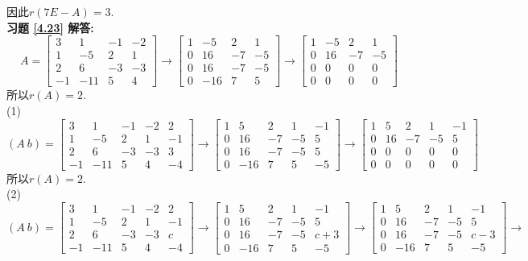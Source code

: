 因此$r(7E-A)=3.$\\
\textbf{习题 \ref{4.23} 解答:}\\
$$A=\begin{bmatrix}3&1&-1&-2\\1&-5&2&1\\2&6&-3&-3\\-1&-11&5&4\end{bmatrix}\rightarrow\begin{bmatrix}1&-5&2&1\\ 0&16&-7&-5\\0&16&-7&-5\\0&-16&7&5\end{bmatrix}
\rightarrow\begin{bmatrix}1&-5&2&1\\ 0&16&-7&-5\\0&0&0&0\\0&0&0&0\end{bmatrix}$$
所以$r(A)=2$.\\
(1) $$(A\ b)=\begin{bmatrix}3&1&-1&-2&2\\1&-5&2&1&-1\\2&6&-3&-3&3\\-1&-11&5&4&-4\end{bmatrix}\rightarrow
\begin{bmatrix}1&5&2&1&-1\\0&16&-7&-5&5\\0&16&-7&-5&5\\0&-16&7&5&-5\end{bmatrix}\rightarrow
\begin{bmatrix}1&5&2&1&-1\\0&16&-7&-5&5\\0&0&0&0&0\\0&0&0&0&0\end{bmatrix} $$
所以$r(A)=2$.\\
(2) $$(A\ b)=\begin{bmatrix}3&1&-1&-2&2\\1&-5&2&1&-1\\2&6&-3&-3&c\\-1&-11&5&4&-4\end{bmatrix}\rightarrow
\begin{bmatrix}1&5&2&1&-1\\0&16&-7&-5&5\\0&16&-7&-5&c+3\\0&-16&7&5&-5\end{bmatrix}\rightarrow
\begin{bmatrix}1&5&2&1&-1\\0&16&-7&-5&5\\0&16&-7&-5&c-3\\0&-16&7&5&-5\end{bmatrix}\rightarrow$$
